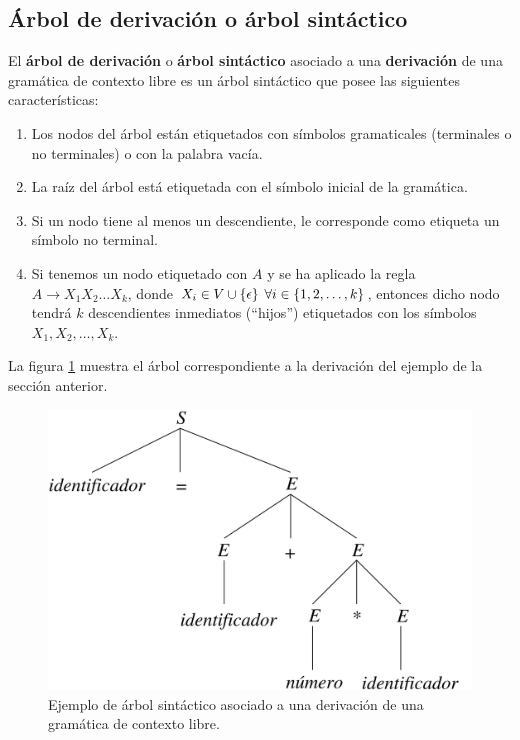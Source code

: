 \subsection{Árbol de derivación o árbol sintáctico}

El \textbf{árbol de derivación} o \textbf{árbol sintáctico} asociado a una \textbf{derivación} de una gramática de contexto libre es un árbol sintáctico que posee las siguientes características:
\begin{enumerate}
\item Los nodos del árbol están etiquetados con símbolos gramaticales (terminales o no terminales) o con la palabra vacía.
\item La raíz del árbol está etiquetada con el símbolo inicial de la gramática.
\item Si un nodo tiene al menos un descendiente, le corresponde como etiqueta un símbolo no terminal.
\item Si tenemos un nodo etiquetado con $A$ y se ha aplicado la regla $A \longrightarrow X_1 X_2 \dots X_k$, donde $X_i \in V \cup \{\epsilon\} \hspace{1ex} \forall i \in \{1,2,\dots,k\}$, entonces dicho nodo tendrá $k$ descendientes inmediatos (``hijos'') etiquetados con los símbolos $X_1, X_2, \dots, X_k$.
\end{enumerate}

La figura \ref{fig-arbol-derivacion-gramatica-contexto-libre} muestra el árbol correspondiente a la derivación del ejemplo de la sección anterior.

\begin{figure}[htp]
\centering
\includegraphics[scale=0.5]{figuras/Cap3/arbol-derivacion-gramatica-contexto-libre.pdf}
 \caption{Ejemplo de árbol sintáctico asociado a una derivación de una gramática de contexto libre.}\label{fig-arbol-derivacion-gramatica-contexto-libre}
\end{figure}


